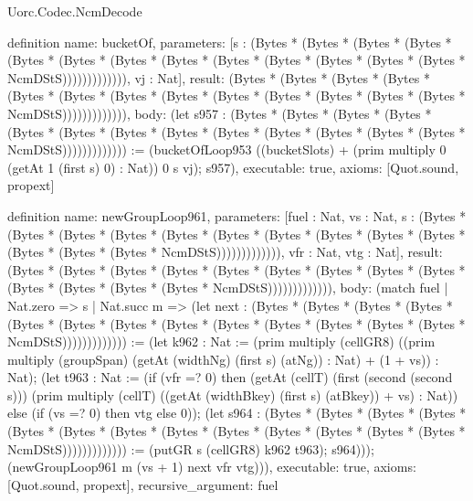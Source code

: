 \begin{lexlean}{Uorc.Codec.NcmDecode}
\begin{semanticmodule}
definition{
  name: bucketOf,
  parameters: [s : (Bytes * (Bytes * (Bytes * (Bytes * (Bytes * (Bytes * (Bytes * (Bytes * (Bytes * (Bytes * (Bytes * (Bytes * (Bytes * NcmDStS))))))))))))), vj : Nat],
  result: (Bytes * (Bytes * (Bytes * (Bytes * (Bytes * (Bytes * (Bytes * (Bytes * (Bytes * (Bytes * (Bytes * (Bytes * (Bytes * NcmDStS))))))))))))),
  body: (let s957 : (Bytes * (Bytes * (Bytes * (Bytes * (Bytes * (Bytes * (Bytes * (Bytes * (Bytes * (Bytes * (Bytes * (Bytes * (Bytes * NcmDStS))))))))))))) := (bucketOfLoop953 ((bucketSlots) + (prim multiply 0 (getAt 1 (first s) 0) : Nat)) 0 s vj); s957),
  executable: true,
  axioms: [Quot.sound, propext]
}

definition{
  name: newGroupLoop961,
  parameters: [fuel : Nat, vs : Nat, s : (Bytes * (Bytes * (Bytes * (Bytes * (Bytes * (Bytes * (Bytes * (Bytes * (Bytes * (Bytes * (Bytes * (Bytes * (Bytes * NcmDStS))))))))))))), vfr : Nat, vtg : Nat],
  result: (Bytes * (Bytes * (Bytes * (Bytes * (Bytes * (Bytes * (Bytes * (Bytes * (Bytes * (Bytes * (Bytes * (Bytes * (Bytes * NcmDStS))))))))))))),
  body: (match fuel
    | Nat.zero => s
    | Nat.succ m => (let next : (Bytes * (Bytes * (Bytes * (Bytes * (Bytes * (Bytes * (Bytes * (Bytes * (Bytes * (Bytes * (Bytes * (Bytes * (Bytes * NcmDStS))))))))))))) := (let k962 : Nat := (prim multiply (cellGR8) ((prim multiply (groupSpan) (getAt (widthNg) (first s) (atNg)) : Nat) + (1 + vs)) : Nat); (let t963 : Nat := (if (vfr =? 0) then (getAt (cellT) (first (second (second s))) (prim multiply (cellT) ((getAt (widthBkey) (first s) (atBkey)) + vs) : Nat)) else (if (vs =? 0) then vtg else 0)); (let s964 : (Bytes * (Bytes * (Bytes * (Bytes * (Bytes * (Bytes * (Bytes * (Bytes * (Bytes * (Bytes * (Bytes * (Bytes * (Bytes * NcmDStS))))))))))))) := (putGR s (cellGR8) k962 t963); s964))); (newGroupLoop961 m (vs + 1) next vfr vtg))),
  executable: true,
  axioms: [Quot.sound, propext],
  recursive_argument: fuel
}


\end{semanticmodule}
\end{lexlean}
